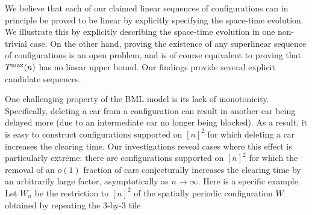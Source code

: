 \documentclass[reqno]{amsart}
\begin{document}
We believe that each of our claimed linear sequences of configurations can in principle be proved to be linear by explicitly specifying the space-time evolution.  We illustrate this by explicitly describing the space-time evolution in one non-trivial case.  On the other hand, proving the existence of any superlinear sequence of configurations is an open problem, and is of course equivalent to proving that $T^{\text{\rm max}}(n)$ has no linear upper bound.  Our findings provide several explicit candidate sequences.

One challenging property of the BML model is its lack of monotonicity.
Specifically, deleting a car from a configuration can result in another car being delayed more (due to an intermediate car no longer being blocked).  As a result, it is easy to construct configurations supported on $[n]^2$ for which deleting a car increases the clearing time.  Our investigations reveal cases where this effect is particularly extreme: there are configurations supported on $[n]^2$ for which the removal of an $o(1)$ fraction of cars conjecturally increases the clearing time by an arbitrarily large factor, asymptotically as $n\to\infty$.  Here is a specific example. Let $W_n$ be the restriction to $[n]^2$ of the spatially periodic configuration $W$ obtained by repeating the 3-by-3 tile 
\end{document}
